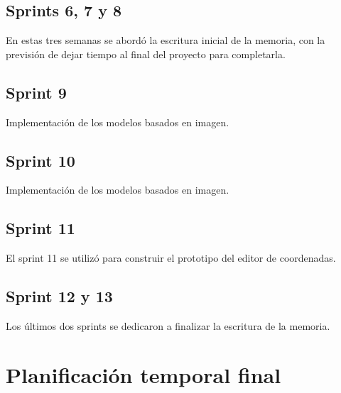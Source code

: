 \subsection{Sprints 6, 7 y 8}

En estas tres semanas se abordó la escritura inicial de la memoria, con la previsión de dejar tiempo al final del proyecto para completarla.

\subsection{Sprint 9}

Implementación de los modelos basados en imagen.

\subsection{Sprint 10}

Implementación de los modelos basados en imagen.

\subsection{Sprint 11}

El sprint 11 se utilizó para construir el prototipo del editor de coordenadas.

\subsection{Sprint 12 y 13}

Los últimos dos sprints se dedicaron a finalizar la escritura de la memoria.


\section{Planificación temporal final}

